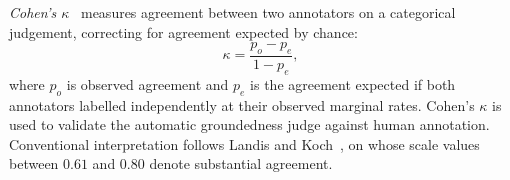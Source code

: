 \emph{Cohen's $\kappa$}~\cite{cohen1960coefficient} measures agreement between
two annotators on a categorical judgement, correcting for agreement expected by
chance: \[ \kappa = \frac{p_o - p_e}{1 - p_e}, \] where $p_o$ is observed
agreement and $p_e$ is the agreement expected if both annotators labelled
independently at their observed marginal rates. Cohen's $\kappa$ is used to
validate the automatic groundedness judge against human annotation. Conventional
interpretation follows Landis and Koch~\cite{landis1977measurement}, on whose
scale values between $0.61$ and $0.80$ denote substantial agreement.

\endinput
